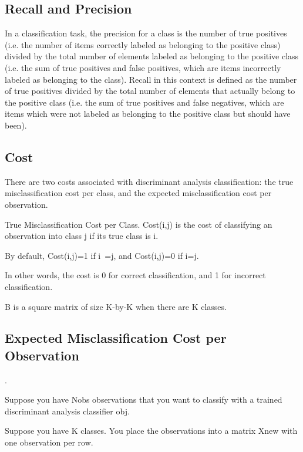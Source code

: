 \documentclass[12pt]{article} %
\begin{document}
\subsection{Recall and Precision}

In a classification task, the precision for a class is the number of true positives (i.e. the number of items correctly labeled as belonging to the positive class) divided by the total number of elements labeled as belonging to the positive class (i.e. the sum of true positives and false positives, which are items incorrectly labeled as belonging to the class). Recall in this context is defined as the number of true positives divided by the total number of elements that actually belong to the positive class (i.e. the sum of true positives and false negatives, which are items which were not labeled as belonging to the positive class but should have been).

\subsection*{Cost}

There are two costs associated with discriminant analysis classification: the true misclassification cost per class, and the expected misclassification cost per observation.

True Misclassification Cost per Class.  Cost(i,j) is the cost of classifying an observation into class j if its true class is i. 

By default, Cost(i,j)=1 if i~=j, and Cost(i,j)=0 if i=j. 

In other words, the cost is 0 for correct classification, and 1 for incorrect classification.

B is a square matrix of size K-by-K when there are K classes. 

\subsection{Expected Misclassification Cost per Observation}.  

Suppose you have Nobs observations that you want to classify with a trained discriminant analysis classifier obj. 

Suppose you have K classes. You place the observations into a matrix Xnew with one observation per row. 

\end{document}
